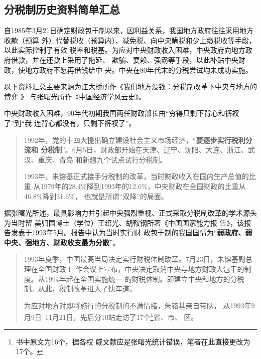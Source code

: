 
\subsection{分税制历史资料简单汇总}

自1985年3月21日确定财政包干制以来，因利益关系，我国地方政府往往采用地方收款（预算
外）代替税收（预算内）、减免税、向中央瞒税和少上缴税收等手段，以此实际控制了有效
税率和税基。为应对中央财政收入困难，中央政府向地方政府借款，并在还款上采用了拖延、
欺骗、耍赖、强霸等手段，以此补贴中央财政，使地方政府不愿再借钱给中
央。\cite{majuncaigai}中央在80年代末的分税尝试均未成功实施。

以下资料汇总主要来源为江大桥所作《我们地方没钱：分税制改革下中央与地方的博弈 》
\cite{difangmeiqian}与张曙光所作《中国经济学风云史》。

中央财政收入困难，90年代初期我国两任财政部长由“穷得只剩下背心和裤衩了”到“我
连背心都没有，只剩下裤衩了”。

\begin{quotation}
  1992年，党的十四大提出确立建设社会主义市场经济，“\textbf{要逐步实行税利分流和
    分税制}”。6月5日，财政部开始在天津、辽宁、沈阳、大连、浙江、武汉、重庆、青岛
  和新疆九个试点试行分税制。

  1993年，朱镕基正式接手分税制的改革，当时财政收入在国内生产总值的比重
  从1979年的28.4\%降到1993年的12.6\%，中央财政在全国财政的比重从46.8\%降到31.6\%，
  也就是所谓“双降”的局面。
\end{quotation}

据张曙光所述，最具影响力并引起中央强烈重视、正式采取分税制改革的学术源头为当时留
美归国博士（学位）王绍光、胡鞍钢所著《中国国家能力报
告》，该报告发表于1993年5月。报告中认为当时实行财
政包干制的我国国情为“\textbf{弱政府、弱中央、强地方、财政收支最为分散}”。

\begin{quotation}
  1993年夏季，中国最高当局决定实行财税体制改革。7月23日，朱镕基副总理在全国财政工
  作会议上宣布，中央决定取消中央与地方财政大包干的制度。从1994年起在全国实施统一
  的财税体制。即建立中央和地方的分税制。从此，税制改革进入了快车道。

  为应对地方对即将施行的分税制的不满情绪，朱镕基亲自带队，
  从1993年9月9日--11月21日，先后分10站走访了17个\footnote{书中原文为16个，据各权
    威文献应是张曙光统计错误，笔者在此直接更改为17个。}省、市、
  区。
\end{quotation}


